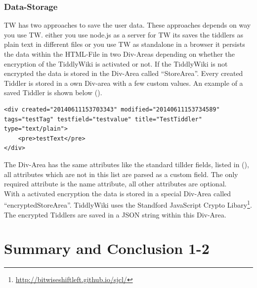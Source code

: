 \documentclass[12pt,a4paper]{article}
\begin{document}
\subsubsection*{Data-Storage}
TW has two approaches to save the user data. These approaches depends on way you use TW. either you use node.js as a server for TW its saves the tiddlers as plain text in different files or you use TW as standalone in a browser it persists the data within the HTML-File in two Div-Areas depending on whether the encryption of the TiddlyWiki is activated or not. If the TiddlyWiki is not encrypted the data is stored in the Div-Area called ``StoreArea''. Every created Tiddler is stored in a own Div-area with a few custom values. An example of a saved Tiddler is shown below (). 
\begin{lstlisting}[caption={Data-Div},label=lst:data-div]
<div created="20140611153703343" modified="20140611153734589" tags="testTag" testfield="testvalue" title="TestTiddler" type="text/plain">
	<pre>testText</pre>
</div>
\end{lstlisting}
The Div-Area has the same attributes like the standard tillder fields, listed in  (), all attributes which are not in this list are parsed as a custom field. The only required attribute is the name attribute, all other attributes are optional.\\
With a activated encryption the data is stored in a special Div-Area called ``encryptedStoreArea''. TiddlyWiki uses the Standford JavaScript Crypto Libary\footnote{\url{http://bitwiseshiftleft.github.io/sjcl/}}. The encrypted Tiddlers are saved in a JSON string within this Div-Area.

\newpage
\section{Summary and Conclusion 1-2}


\end{document}
